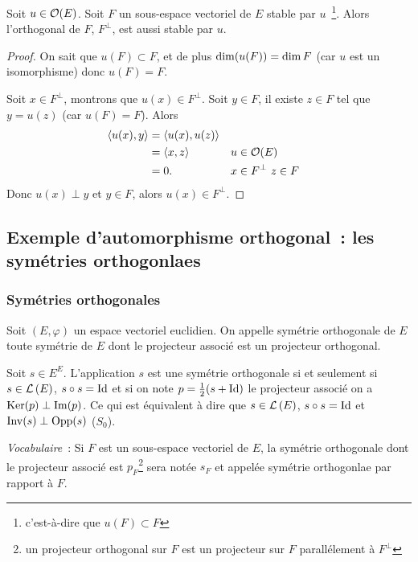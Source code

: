 \begin{prop}
  Soit \(u \in \mathcal{O}\!\left(E\right)\). Soit \(F\) un sous-espace vectoriel de \(E\) stable 
  par \(u\)~\footnote{c'est-à-dire que \(u(F)\subset F\)}. Alors l'orthogonal de 
  \(F\), \(F^\perp\), est aussi stable par \(u\).
\end{prop}
\begin{proof}
  On sait que \(u(F) \subset F\), et de plus \(\operatorname{dim}(u(F)) = \operatorname{dim} F\) (car \(u\) 
  est un isomorphisme) donc \(u(F)=F\).

  Soit \(x \in F^\perp\), montrons que \(u(x) \in F^\perp\). Soit \(y \in F\), 
  il existe \(z \in F\) tel que \(y=u(z)\) (car \(u(F)=F\)). Alors
  \begin{align}
    \left\langle{u(x)},{y}\right\rangle &= \left\langle{u(x)},{u(z)}\right\rangle \\
    &= \left\langle{x},{z}\right\rangle && u \in \mathcal{O}\!\left(E\right) \\
    &=0. && x \in F^\perp \ z \in F
  \end{align}
  Donc \(u(x) \perp y\) et \(y \in F\), alors \(u(x) \in F^\perp\).
\end{proof}

\subsection{Exemple d'automorphisme orthogonal~: les symétries orthogonlaes}

\subsubsection{Symétries orthogonales}

\begin{defdef}
  Soit \((E,\varphi)\) un espace vectoriel euclidien. On appelle symétrie 
  orthogonale de \(E\) toute symétrie de \(E\) dont le projecteur associé est un 
  projecteur orthogonal.
\end{defdef}

Soit \(s \in E^E\). L'application \(s\) est une symétrie orthogonale si et 
seulement si \(s \in \mathcal{L}\left(E\right)\), \(s \circ s = \operatorname{Id}\) et si on note 
\(p=\frac{1}{2}(s+\operatorname{Id})\) le projecteur associé on a \(\operatorname{Ker}(p) \perp \operatorname{Im}(p)\). 
Ce qui est équivalent à dire que \(s \in \mathcal{L}\left(E\right)\), \(s \circ s = \operatorname{Id}\) et 
\(\operatorname{Inv}(s)\perp \operatorname{Opp}(s)\) (\(S_0\)).

\emph{Vocabulaire}~: Si \(F\) est un sous-espace vectoriel de \(E\), la symétrie 
orthogonale dont le projecteur associé est \(p_F\)\footnote{un projecteur 
orthogonal sur \(F\) est un projecteur sur \(F\) parallélement à \(F^\perp\)} 
sera notée \(s_F\) et appelée symétrie orthogonlae par rapport à \(F\).

